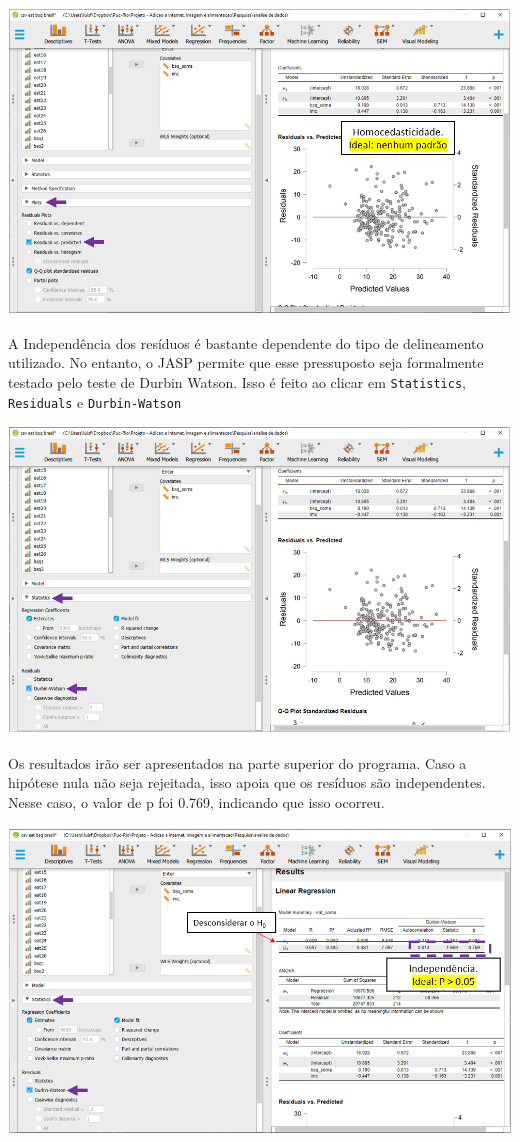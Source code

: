 \documentclass[
]{book}
\begin{document}
\includegraphics{./img/cap_reg_multipla_homocedasticidade.png}

A Independência dos resíduos é bastante dependente do tipo de delineamento utilizado. No entanto, o JASP permite que esse pressuposto seja formalmente testado pelo teste de Durbin Watson. Isso é feito ao clicar em \texttt{Statistics}, \texttt{Residuals} e \texttt{Durbin-Watson}

\includegraphics{./img/cap_reg_multipla_ind_residuos.png}

Os resultados irão ser apresentados na parte superior do programa. Caso a hipótese nula não seja rejeitada, isso apoia que os resíduos são independentes. Nesse caso, o valor de p foi 0.769, indicando que isso ocorreu.

\includegraphics{./img/cap_reg_multipla_ind_residuos2.png}
\end{document}
